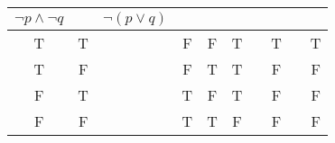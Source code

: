 {\begin{enumerate}
\begin{tabular}{ | c | c | c | c |  c | c | c | c | c | c | }
                $ \neg p \land \neg q $ & &
                $ \neg ( p \lor q ) $
                \\ \hline
            T & T & & F & F
            &  T  &
            &  T  &
            &  T 
            \\ \hline
            T & F & & F & T
            &  T  &
            &  F  &
            &  F 
            \\ \hline
            F & T & & T & F
            &  T  &
            &  F  &
            &  F 
            \\ \hline
            F & F & & T & T
            &  F  &
            &  F  &
            &  F 
            \\ \hline
        \end{tabular}
    \end{enumerate}
}


